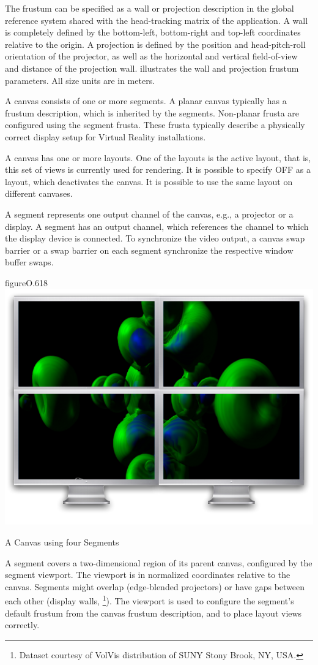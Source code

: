 The frustum can be specified as a wall or projection description in the global
reference system shared with the head-tracking matrix of the application. A
wall is completely defined by the bottom-left, bottom-right and top-left
coordinates relative to the origin. A projection is defined by the position and
head-pitch-roll orientation of the projector, as well as the horizontal and
vertical field-of-view and distance of the projection wall. 
illustrates the wall and projection frustum parameters. All size units are in
meters.

A canvas consists of one or more segments. A planar canvas typically has a
frustum description, which is inherited by the segments. Non-planar frusta are
configured using the segment frusta. These frusta typically describe a
physically correct display setup for Virtual Reality installations.

A canvas has one or more layouts. One of the layouts is the active layout, that
is, this set of views is currently used for rendering. It is possible to
specify \textsf{OFF} as a layout, which deactivates the canvas. It is possible
to use the same layout on different canvases.

A \textsf{segment} represents one output channel of the canvas, e.g., a
projector or a display. A segment has an output channel, which references the
channel to which the display device is connected. To synchronize the video
output, a canvas swap barrier or a swap barrier on each segment synchronize the
respective window buffer swaps.

\begin{wrapfloat}{figure}{O}{.618\textwidth}
  \includegraphics[width=.618\textwidth]{images/canvas.pdf}
  {\caption{\label{fCanvas}A Canvas using four Segments}}
\end{wrapfloat}

A segment covers a two-dimensional region of its parent canvas, configured by
the segment viewport. The viewport is in normalized coordinates relative to the
canvas. Segments might overlap (edge-blended projectors) or have gaps between
each other (display walls, \footnote{Dataset courtesy of VolVis
distribution of SUNY Stony Brook, NY, USA.}). The viewport is used to configure
the segment's default frustum from the canvas frustum description, and to place
layout views correctly.

